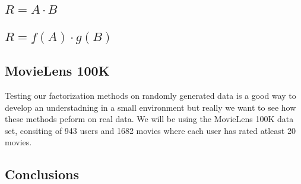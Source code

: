 \documentclass{article}
\begin{document}
\subsection{$R = A \cdot B$}

\subsection{$R = f(A) \cdot g(B)$}

\subsection{MovieLens 100K}

Testing our factorization methods on randomly generated data is a good way to develop an understadning in a small environment but really we want to see how these methods peform on real data. We will be using the MovieLens 100K data set, consiting of 943 users and 1682 movies where each user has rated atleast 20 movies.

\subsection{Conclusions}
\end{document}

